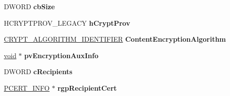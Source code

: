 \begin{DoxyCompactItemize}
\item 
\mbox{\label{struct___c_m_s_g___e_n_v_e_l_o_p_e_d___e_n_c_o_d_e___i_n_f_o___w_i_t_h___c_m_s_a3491ada18c8f166d912c781caf20f7d5}} 
D\+W\+O\+RD {\bfseries cb\+Size}
\item 
\mbox{\label{struct___c_m_s_g___e_n_v_e_l_o_p_e_d___e_n_c_o_d_e___i_n_f_o___w_i_t_h___c_m_s_ac86e47719b51ed1e95d85269aba9b4ba}} 
H\+C\+R\+Y\+P\+T\+P\+R\+O\+V\+\_\+\+L\+E\+G\+A\+CY {\bfseries h\+Crypt\+Prov}
\item 
\mbox{\label{struct___c_m_s_g___e_n_v_e_l_o_p_e_d___e_n_c_o_d_e___i_n_f_o___w_i_t_h___c_m_s_a3f54f8358c2f6f4b7e8aff3aa99b4d27}} 
\hyperlink{struct___c_r_y_p_t___a_l_g_o_r_i_t_h_m___i_d_e_n_t_i_f_i_e_r}{C\+R\+Y\+P\+T\+\_\+\+A\+L\+G\+O\+R\+I\+T\+H\+M\+\_\+\+I\+D\+E\+N\+T\+I\+F\+I\+ER} {\bfseries Content\+Encryption\+Algorithm}
\item 
\mbox{\label{struct___c_m_s_g___e_n_v_e_l_o_p_e_d___e_n_c_o_d_e___i_n_f_o___w_i_t_h___c_m_s_a71e681b9285e3249569d3f2f9fda9e62}} 
\hyperlink{interfacevoid}{void} $\ast$ {\bfseries pv\+Encryption\+Aux\+Info}
\item 
\mbox{\label{struct___c_m_s_g___e_n_v_e_l_o_p_e_d___e_n_c_o_d_e___i_n_f_o___w_i_t_h___c_m_s_af6b6556ae7b9fb38ee698edd950b3163}} 
D\+W\+O\+RD {\bfseries c\+Recipients}
\item 
\mbox{\label{struct___c_m_s_g___e_n_v_e_l_o_p_e_d___e_n_c_o_d_e___i_n_f_o___w_i_t_h___c_m_s_a95e387e7d790d24b035df2302bede844}} 
\hyperlink{struct___c_e_r_t___i_n_f_o}{P\+C\+E\+R\+T\+\_\+\+I\+N\+FO} $\ast$ {\bfseries rgp\+Recipient\+Cert}
\item 
\mbox{\label{struct___c_m_s_g___e_n_v_e_l_o_p_e_d___e_n_c_o_d_e___i_n_f_o___w_i_t_h___c_m_s_a3c7e7dcca37c08c9915caa7c0fc10a87}} 

\end{DoxyCompactItemize}
